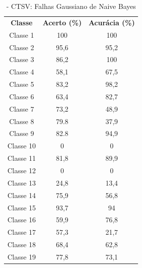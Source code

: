 \begin{itemize}
 \begin{table}[ht]
\centering
\begin{tabular}{ccc}
\textbf{Classe} & \textbf{Acerto (\%)} & \textbf{Acurácia (\%)} \\
Classe 1        & 100                  & 100                    \\
Classe 2        & 95,6                  & 95,2                    \\
Classe 3        & 86,2                  & 100                    \\
Classe 4        & 58,1                  & 67,5                    \\
Classe 5        & 83,2                 & 98,2                    \\
Classe 6        & 63,4                  & 82,7                    \\
Classe 7        & 73,2                  & 48,9                    \\
Classe 8        & 79.8                  & 37,9                    \\
Classe 9        & 82.8                  & 94,9                    \\
Classe 10       & 0                  & 0                    \\
Classe 11       & 81,8            & 89,9   
     \\
Classe 12       & 0                 & 0   
     \\
Classe 13      & 24,8                 & 13,4    
     \\
Classe 14       &  75,9                & 56,8   
     \\
Classe 15       & 93,7                 & 94
     \\
Classe 16       & 59,9                &    76,8
     \\
Classe 17       & 57,3                & 21,7
     \\
Classe 18     &  68,4              &    62,8 
     \\
Classe 19       & 77,8                 & 73,1                                 
\end{tabular}
\caption{\label{tab:ctsvnGND}- CTSV: Falhas Gaussiano de Naive Bayes}
\end{table}



\end{itemize}
